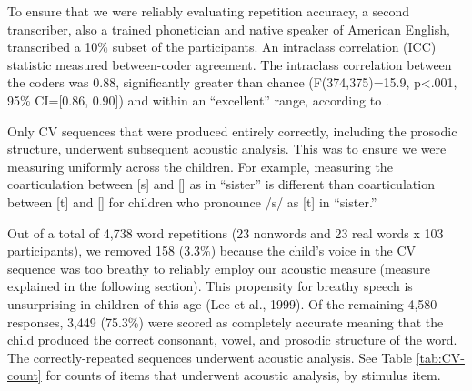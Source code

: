 \documentclass[a4paper,man,natbib,donotrepeattitle, apacite]{apa6}
\begin{document}
To ensure that we were reliably evaluating repetition accuracy, a second transcriber, also a trained phonetician and native speaker of American English, transcribed a 10\% subset of the participants. An intraclass correlation (ICC) statistic measured between-coder agreement. The intraclass correlation between the coders was 0.88, significantly greater than chance (F(374,375)=15.9, p<.001, 95\% CI=[0.86, 0.90]) and within an ``excellent'' range, according to \cite{cicchettiGuidelinesCriteriaRules1994}. 

Only CV sequences that were produced entirely correctly, including the prosodic structure, underwent subsequent acoustic analysis. This was to ensure we were measuring uniformly across the children. For example, measuring the coarticulation between [s] and [\textsci] as in ``sister'' is different than coarticulation between [t] and [\textsci] for children who pronounce /s/ as [t] in ``sister.''

Out of a total of 4,738 word repetitions (23 nonwords and 23 real words x 103 participants), we removed 158 (3.3\%) because the child’s voice in the CV sequence was too breathy to reliably employ our acoustic measure (measure explained in the following section). This propensity for breathy speech is unsurprising in children of this age (Lee et al., 1999). Of the remaining 4,580 responses, 3,449 (75.3\%) were scored as completely accurate meaning that the child produced the correct consonant, vowel, and prosodic structure of the word. The correctly-repeated sequences underwent acoustic analysis. See Table \ref{tab:CV-count} for counts of items that underwent acoustic analysis, by stimulus item.
\end{document}
